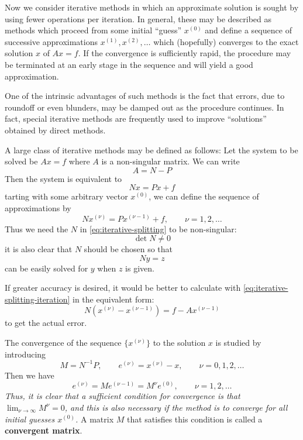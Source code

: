 \documentclass[../main.tex]{subfiles}
\begin{document}
Now we consider iterative methods in which an approximate solution is sought by using fewer operations per iteration. In general, these may be described as methods which proceed from some initial ``guess'' $x^{(0)}$ and define a sequence of successive approximations $x^{(1)}, x^{(2)}, \ldots$ which (hopefully) converges to the exact solution $x$ of $A x = f$. If the convergence is sufficiently rapid, the procedure may be terminated at an early stage in the sequence and will yield a good approximation.

\begin{remark}
	One of the intrinsic advantages of such methods is the fact that errors, due to roundoff or even blunders, may be damped out as the procedure continues. In fact, special iterative methods are frequently used to improve ``solutions'' obtained by direct methods.
\end{remark}

A large class of iterative methods may be defined as follows: Let the system to be solved be $A x = f$ where $A$ is a non-singular matrix. We can write
\begin{equation} \label{eq:iterative-splitting}
	A = N - P
\end{equation}
Then the system is equivalent to
\begin{equation}
	N x = P x + f
\end{equation}
tarting with some arbitrary vector $x^{(0)}$, we can define the sequence of approximations by
\begin{equation}\label{eq:iterative-splitting-iteration}
	N x^{(\nu)} = P x^{(\nu-1)} + f, \qquad \nu = 1, 2, \ldots
\end{equation}
Thus we need the $N$ in \eqref{eq:iterative-splitting} to be non-singular:
\begin{equation*}
	\det N \neq 0
\end{equation*}
it is also clear that $N$ should be chosen so that
\begin{equation*}
	N y = z
\end{equation*}
can be easily solved for $y$ when $z$ is given.

If greater accuracy is desired, it would be better to calculate with \eqref{eq:iterative-splitting-iteration} in the equivalent form:
\begin{equation*}
	N(x^{(\nu)} - x^{(\nu-1)}) = f - A x^{(\nu-1)}
\end{equation*}
to get the actual error.

The convergence of the sequence $\{ x^{(\nu)} \}$ to the solution $x$ is studied by introducing
\begin{equation}
	M = N^{-1} P, \qquad e^{(\nu)} = x^{(\nu)} - x, \qquad \nu = 0, 1, 2, \ldots
\end{equation}
Then we have
\begin{equation*}
	e^{(\nu)} = M e^{(\nu-1)} = M^{\nu} e^{(0)}, \qquad \nu = 1, 2, \ldots
\end{equation*}
\emph{Thus, it is clear that a sufficient condition for convergence is that $\lim_{\nu \to \infty} M^{\nu} = 0$, and this is also necessary if the method is to converge for all initial guesses $x^{(0)}$.} A matrix $M$ that satisfies this condition is called a \textbf{convergent matrix}.
\end{document}
